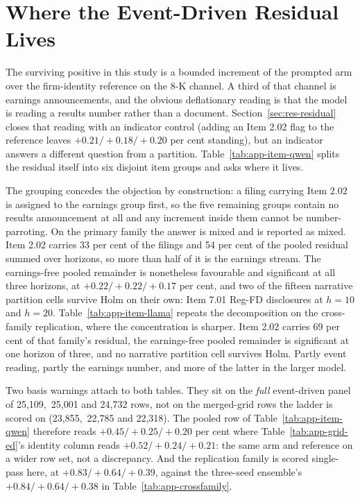 \FloatBarrier
\section{Where the Event-Driven Residual Lives}
\label{app:res-itemgeography}

The surviving positive in this study is a bounded increment of the prompted
arm over the firm-identity reference on the 8-K channel. A third of that
channel is earnings announcements, and the obvious deflationary reading is
that the model is reading a results number rather than a document.
Section~\ref{sec:res-residual} closes that reading with an
indicator control (adding an Item 2.02 flag to the reference leaves
$+0.21/+0.18/+0.20$ per cent standing), but an indicator answers a
different question from a partition. Table~\ref{tab:app-item-qwen} splits
the residual itself into six disjoint item groups and asks where it lives.

The grouping concedes the objection by construction: a filing carrying Item
2.02 is assigned to the earnings group first, so the five remaining groups
contain no results announcement at all and any increment inside them cannot
be number-parroting. On the primary family the answer is mixed and is
reported as mixed. Item 2.02 carries 33 per cent of the filings and 54 per
cent of the pooled residual summed over horizons, so more than half of it
is the earnings stream. The earnings-free pooled remainder is nonetheless
favourable and significant at all three horizons, at $+0.22/+0.22/+0.17$
per cent, and two of the fifteen narrative partition cells survive Holm on
their own: Item 7.01 Reg-FD disclosures at $h{=}10$ and $h{=}20$.
Table~\ref{tab:app-item-llama} repeats the decomposition on the
cross-family replication, where the concentration is sharper. Item 2.02
carries 69 per cent of that family's residual, the earnings-free pooled
remainder is significant at one horizon of three, and no narrative
partition cell survives Holm. Partly event reading, partly the earnings
number, and more of the latter in the larger model.

Two basis warnings attach to both tables. They sit on the \emph{full}
event-driven panel of 25{,}109,\ 25{,}001 and 24{,}732 rows, not on the
merged-grid rows the ladder is scored on (23{,}855,\ 22{,}785 and
22{,}318). The pooled row of Table~\ref{tab:app-item-qwen} therefore reads
$+0.45/+0.25/+0.20$ per cent where Table~\ref{tab:app-grid-ed}'s
identity column reads $+0.52/+0.24/+0.21$: the same arm and reference on a
wider row set, not a discrepancy. And the replication family is scored
single-pass here, at $+0.83/+0.64/+0.39$, against the three-seed ensemble's
$+0.84/+0.64/+0.38$ in Table~\ref{tab:app-crossfamily}.

